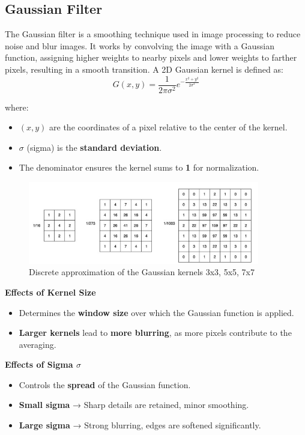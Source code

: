 \documentclass[hidelinks,12pt]{article}
\begin{document}
	\pagebreak
	
	
	\subsection{Gaussian Filter}
	
	The Gaussian filter is a smoothing technique used in image processing to reduce noise and blur images. It works by convolving the image with a Gaussian function, assigning higher weights to nearby pixels and lower weights to farther pixels, resulting in a smooth transition. A 2D Gaussian kernel is defined as:
	$$
	G(x, y) = \frac{1}{2\pi\sigma^2} e^{-\frac{x^2 + y^2}{2\sigma^2}}
	$$
	
	 where:
	\begin{itemize}
		\item \( (x, y) \) are the coordinates of a pixel relative to the center of the kernel.
		\item \( \sigma \) (sigma) is the \textbf{standard deviation}.
		\item The denominator ensures the kernel sums to \textbf{1} for normalization.
	\end{itemize}
	
	\begin{figure}[h!]
		\centering
		\includegraphics[width=0.9\textwidth]{figures/Gaussian_kernels.jpg} 
		\caption{Discrete approximation of the Gaussian kernels 3x3, 5x5, 7x7}
	\end{figure}
	
	 \textbf{Effects of Kernel Size}
	\begin{itemize}
		\item Determines the \textbf{window size} over which the Gaussian function is applied.
		\item \textbf{Larger kernels} lead to \textbf{more blurring}, as more pixels contribute to the averaging.
	\end{itemize}
	
	 \textbf{Effects of Sigma \( \sigma \)}
	\begin{itemize}
		\item Controls the \textbf{spread} of the Gaussian function.
		\item \textbf{Small sigma} → Sharp details are retained, minor smoothing.
		\item \textbf{Large sigma} → Strong blurring, edges are softened significantly.
	\end{itemize}
	
\end{document}

